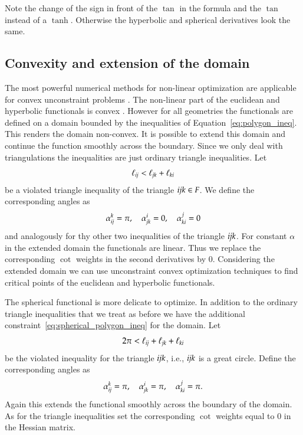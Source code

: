 \documentclass[Thesis]{subfiles}
\begin{document}
Note the change of the sign in front of the $\tan$ in the formula and the $\tan$ instead of a $\tanh$. Otherwise the hyperbolic and spherical 
derivatives look the same.

\subsection{Convexity and extension of the domain}

The most powerful numerical methods for non-linear optimization are applicable for convex unconstraint problems \cite{boyd2004convex}.
The non-linear part of the euclidean and hyperbolic functionals is convex \cite{Bobenko2010}. 
However for all geometries the functionals are defined on a domain bounded by the inequalities of Equation~\ref{eq:polygon_ineq}.
This renders the domain non-convex. 
It is possible to extend this domain and continue the function smoothly across the boundary.
Since we only deal with triangulations the inequalities are just ordinary triangle inequalities. 
Let 
\[\ell_{\it ij} < \ell_{\it jk} + \ell_{\it ki}\] 
be a violated triangle inequality of the triangle $\it ijk \in F$. We define the corresponding angles as
\begin{equation*}
\alpha^k_{\it ij} = \pi,\quad \alpha^i_{\it jk} = 0,\quad \alpha^j_{\it ki} = 0
\end{equation*}
and analogously for thy other two inequalities of the triangle $\it ijk$. 
For constant $\alpha$ in the extended domain the functionals are linear.
Thus we replace the corresponding $\cot$ weights in the second derivatives by $0$.
Considering the extended domain we can use unconstraint convex optimization techniques to find critical points of the euclidean and hyperbolic functionals.

The spherical functional is more delicate to optimize.
In addition to the ordinary triangle inequalities that we treat as before we have the additional constraint~\ref{eq:spherical_polygon_ineq} for the domain.
Let 
\[2\pi < \ell_{\it ij} + \ell_{\it jk} + \ell_{\it ki}\]
be the violated inequality for the triangle $\it ijk$, i.e., $\it ijk$ is a great circle. 
Define the corresponding angles as
\begin{equation*}
\alpha^k_{\it ij} = \pi,\quad \alpha^i_{\it jk} = \pi,\quad \alpha^j_{\it ki} = \pi.
\end{equation*}
Again this extends the functional smoothly across the boundary of the domain. 
As for the triangle inequalities set the corresponding $\cot$ weights equal to $0$ in the Hessian matrix.
\end{document}
